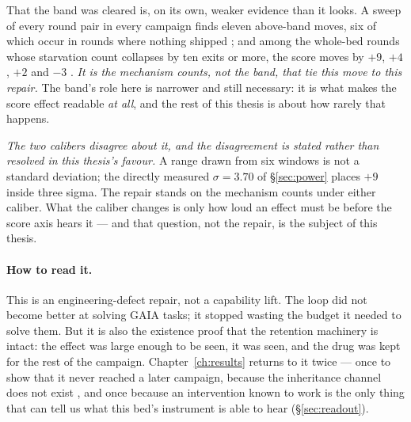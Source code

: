 That the band was cleared is, on its own, weaker evidence than it looks. A
sweep of every round pair in every campaign finds eleven above-band moves,
six of which occur in rounds where nothing shipped ; and among the
whole-bed rounds whose starvation count collapses by ten exits or more, the
score moves by $+9$, $+4$, $+2$ and $-3$ . \emph{It is the mechanism
counts, not the band, that tie this move to this repair.} The band's role
here is narrower and still necessary: it is what makes the score effect
readable \emph{at all}, and the rest of this thesis is about how rarely
that happens.

\emph{The two calibers disagree about it, and the disagreement is stated
rather than resolved in this thesis's favour.} A range drawn from six
windows is not a standard deviation; the directly measured
$\sigma = 3.70$ of \S\ref{sec:power} places $+9$ inside three sigma. The repair
stands on the mechanism counts under either caliber. What the caliber
changes is only how loud an effect must be before the score axis hears it
--- and that question, not the repair, is the subject of this thesis.

\paragraph{How to read it.} This is an engineering-defect repair, not a
capability lift. The loop did not become better at solving GAIA tasks; it
stopped wasting the budget it needed to solve them. But it is also the
existence proof that the retention machinery is intact: the effect was
large enough to be seen, it was seen, and the drug was kept for the rest of
the campaign. Chapter~\ref{ch:results} returns to it twice --- once to show
that it never reached a later campaign, because the inheritance channel
does not exist , and once because an intervention known to work is
the only thing that can tell us what this bed's instrument is able to hear
(\S\ref{sec:readout}).
